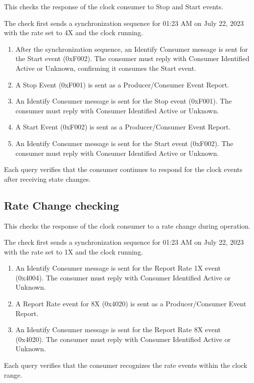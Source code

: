 This checks the response of the clock consumer to Stop and Start events.

The check first sends a synchronization sequence for
    01:23 AM on July 22, 2023 with the rate set to 4X and the clock running.

\begin{enumerate}
\item After the synchronization sequence, an Identify Consumer message is sent
      for the Start event (0xF002).
      The consumer must reply with Consumer Identified Active or Unknown,
      confirming it consumes the Start event.

\item A Stop Event (0xF001) is sent as a Producer/Consumer Event Report.

\item An Identify Consumer message is sent for the Stop event (0xF001).
      The consumer must reply with Consumer Identified Active or Unknown.

\item A Start Event (0xF002) is sent as a Producer/Consumer Event Report.

\item An Identify Consumer message is sent for the Start event (0xF002).
      The consumer must reply with Consumer Identified Active or Unknown.
\end{enumerate}

Each query verifies that the consumer continues to respond for the clock
events after receiving state changes.

\subsection{Rate Change checking}

This checks the response of the clock consumer to a rate change during operation.

The check first sends a synchronization sequence for
    01:23 AM on July 22, 2023 with the rate set to 1X and the clock running.

\begin{enumerate}
\item An Identify Consumer message is sent for the Report Rate 1X event (0x4004).
      The consumer must reply with Consumer Identified Active or Unknown.

\item A Report Rate event for 8X (0x4020) is sent as a Producer/Consumer Event Report.

\item An Identify Consumer message is sent for the Report Rate 8X event (0x4020).
      The consumer must reply with Consumer Identified Active or Unknown.
\end{enumerate}

Each query verifies that the consumer recognizes the rate events within the
clock range.



